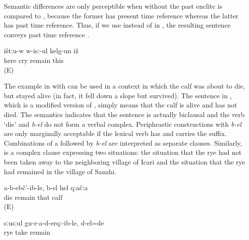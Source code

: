 Semantic differences are only perceptible when  without the past enclitc is compared to , because the former has present time reference whereas the latter has past time reference. Thus, if we use  instead of  in , the resulting sentence conveys past time reference .

\begin{exe}
	\ex	\label{ex:Here he remained crying kelg-un}
	\gll	ištːu-w	w-isː-ul	kelg-un	iž\\
		here	cry	remain	this\\
	\glt	{} (E)

\end{exe}


The example in  with  can be used in a context in which the calf was about to die, but stayed alive (in fact, it fell down a slope but survived). The sentence in , which is a modified version of , simply means that the calf is alive and has not died. The semantics indicates that the sentence is actually biclausal and the verb `die' and \textit{b-el} do not form a verbal complex. Periphrastic constructions with \textit{b-el} are only marginally acceptable if the lexical verb has  and carries the  suffix. Combinations of a  followed by \textit{b-el} are interpreted as separate clauses. Similarly,  is a complex clause expressing two situations: the situation that the rye had not been taken away to the neighboring village of Icari and the situation that the rye had remained in the village of Sanzhi. 

\begin{exe}
	\ex	\label{ex:The calf, not having died, is alive b-el}
	\gll	a-b-ebč'-ib-le,	b-el	hel	qːačːa\\
		die	remain	that	calf\\
	\glt	{} (E)
	
	\ex	\label{ex:The rye was still not taken to Icari (it was left untaken) b-el}
	\gll	sːusːul	gu-r-a-d-erqː-ib-le,	d-el=de	\\
		rye	take	remain	\\
	\glt	{}
\end{exe}



